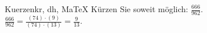 \begin{MAufgabe}{Kuerzen}{kr, dh, MaTeX}
K\"urzen Sie soweit m\"oglich: $\frac{666}{962}$.\\ 
\ifLsg\MLoesung
\quad $\frac{666}{962}=\frac{(74)\cdot(9)}{(74)\cdot(13)}=\frac{9}{13}$.\else\relax\fi
 \end{MAufgabe}
